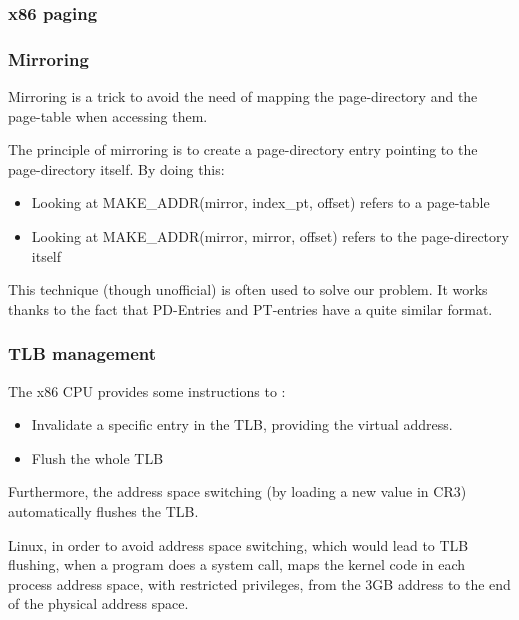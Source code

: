 \begin{frame}
  \frametitle{x86 paging}

  \begin{center}
  \end{center}

\end{frame}


\begin{frame}
  \frametitle{Mirroring}

  Mirroring is a trick to avoid the need of mapping the page-directory
  and the page-table when accessing them.

  \-

  The principle of mirroring is to create a page-directory entry
  pointing to the page-directory itself. By doing this:

  \begin{itemize}
  \item
    Looking at MAKE\_ADDR(mirror, index\_pt, offset) refers to a
    page-table
  \item
    Looking at MAKE\_ADDR(mirror, mirror, offset) refers to the
    page-directory itself
  \end{itemize}

  \-

  This technique (though unofficial) is often used to solve our problem. It works thanks to the fact that PD-Entries and PT-entries have a quite similar format.

\end{frame}

\begin{frame}
  \frametitle{TLB management}

  The x86 CPU provides some instructions to :

  \begin{itemize}
  \item Invalidate a specific entry in the TLB, providing the virtual address.
  \item Flush the whole TLB
  \end{itemize}

  \-

  Furthermore, the address space switching (by loading a new value in CR3) automatically flushes the TLB.

  \-

  Linux, in order to avoid address space switching, which would lead to TLB flushing, when a program does a system call, maps the kernel code in each process address space, with restricted privileges, from the 3GB address to the end of the physical address space.

\end{frame}

